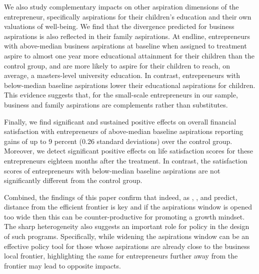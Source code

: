 \documentclass[11.5pt]{article}
\begin{document}
We also study complementary impacts on other aspiration dimensions of the entrepreneur, specifically aspirations for their children's education and their own valuations of well-being. We find that the divergence predicted for business aspirations is also reflected in their family aspirations. At endline, entrepreneurs with above-median business aspirations at baseline when assigned to treatment aspire to almost one year more educational attainment for their children than the control group, and are more likely to aspire for their children to reach, on average, a masters-level university education. In contrast, entrepreneurs with below-median baseline aspirations lower their educational aspirations for children. This evidence suggests that, for the small-scale entrepreneurs in our sample, business and family aspirations are complements rather than substitutes.

Finally, we find significant and sustained positive effects on overall financial satisfaction with entrepreneurs of above-median baseline aspirations reporting gains of up to 9 percent (0.26 standard deviations) over the control group. Moreover, we detect significant positive effects on life satisfaction scores for these entrepreneurs eighteen months after the treatment. In contrast, the satisfaction scores of entrepreneurs with below-median baseline aspirations are not significantly different from the control group.

Combined, the findings of this paper confirm that indeed, as \citet{Ray2006}, \citet{Dalton2016}, and \citet{Genicot2017} predict, distance from the efficient frontier is key and if the aspirations window is opened too wide then this can be counter-productive for promoting a growth mindset. The sharp heterogeneity also suggests an important role for policy in the design of such programs. Specifically, while widening the aspirations window can be an effective policy tool for those whose aspirations are already close to the business local frontier, highlighting the same for entrepreneurs further away from the frontier may lead to opposite impacts.
\end{document}
